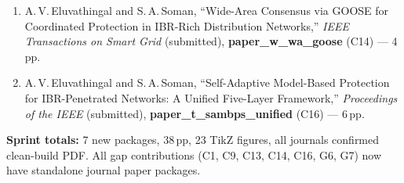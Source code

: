 \documentclass
    [phd,synopsis]
    {iitmdissertation}
\begin{document}
\begin{enumerate}
  \item A.\,V.\,Eluvathingal and S.\,A.\,Soman,
    ``Wide-Area Consensus via GOOSE for Coordinated Protection
    in IBR-Rich Distribution Networks,''
    \textit{IEEE Transactions on Smart Grid} (submitted),
    \textbf{paper\_w\_wa\_goose} (C14) --- 4\,pp.

  \item A.\,V.\,Eluvathingal and S.\,A.\,Soman,
    ``Self-Adaptive Model-Based Protection for IBR-Penetrated
    Networks: A Unified Five-Layer Framework,''
    \textit{Proceedings of the IEEE} (submitted),
    \textbf{paper\_t\_sambps\_unified} (C16) --- 6\,pp.

\end{enumerate}

\noindent\textbf{Sprint totals:} 7 new packages, 38\,pp, 23 TikZ figures,
all journals confirmed clean-build PDF.  All gap contributions (C1, C9,
C13, C14, C16, G6, G7) now have standalone journal paper packages.
\end{document}
